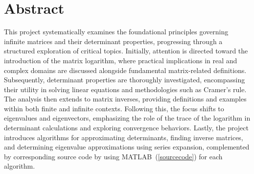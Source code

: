\chapter*{Abstract}
This project systematically examines the foundational principles governing infinite matrices and their determinant properties, progressing through a structured exploration of critical topics. Initially, attention is directed toward the introduction of the matrix logarithm, where practical implications in real and complex domains are discussed alongside fundamental matrix-related definitions. Subsequently, determinant properties are thoroughly investigated, encompassing their utility in solving linear equations and methodologies such as Cramer’s rule. The analysis then extends to matrix inverses, providing definitions and examples within both finite and infinite contexts. Following this, the focus shifts to eigenvalues and eigenvectors, emphasizing the role of the trace of the logarithm in determinant calculations and exploring convergence behaviors. Lastly, the project introduces algorithms for approximating determinants, finding inverse matrices, and determining eigenvalue approximations using series expansion, complemented by corresponding source code by using MATLAB~(\ref{sourcecode}) for each algorithm.
